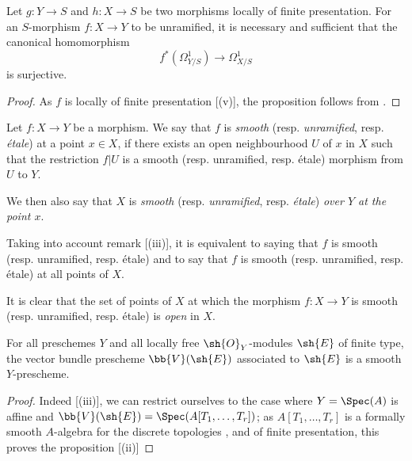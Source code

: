 \begin{proposition}[17.3.6]
\label{IV.17.3.6}
Let $g:Y\to S$ and $h:X\to S$ be two morphisms locally of finite presentation.
For an $S$-morphism $f:X\to Y$ to be unramified, it is necessary and sufficient that the canonical homomorphism 
\[
  f^*(\Omega_{Y/S}^1)\to\Omega_{X/S}^1
\]
is surjective.
\end{proposition}

\begin{proof}
As $f$ is locally of finite presentation [(v)], the proposition follows from .
\end{proof}

\begin{definition}[17.3.7]
\label{IV.17.3.7}
Let $f:X\to Y$ be a morphism.
We say that $f$ is \emph{smooth} (resp. \emph{unramified}, resp. \emph{\'etale}) at a point $x\in X$, if there exists an open neighbourhood $U$ of $x$ in $X$ such that the restriction $f|U$ is a smooth (resp. unramified, resp. \'etale) morphism from $U$ to $Y$.
\end{definition}

We then also say that $X$ is \emph{smooth} (resp. \emph{unramified}, resp. \emph{\'etale}) \emph{over $Y$ at the point $x$}.

Taking into account remark [(iii)], it is equivalent to saying that $f$ is smooth (resp. unramified, resp. \'etale) and to say that $f$ is smooth (resp. unramified, resp. \'etale) at all points of $X$.

It is clear that the set of points of $X$ at which the morphism $f:X\to Y$ is smooth (resp. unramified, resp. \'etale) is \emph{open} in $X$.

\begin{proposition}[17.3.8]
\label{IV.17.3.8}
For all preschemes $Y$ and all locally free $\sh{O}_Y$-modules $\sh{E}$ of finite type, the vector bundle prescheme $\bb{V}(\sh{E})$  associated to $\sh{E}$ is a smooth $Y$-prescheme.
\end{proposition}

\begin{proof}
Indeed [(iii)], we can restrict ourselves to the case where $Y=\Spec(A)$ is affine and $\bb{V}(\sh{E})=\Spec(A[T_1,\dots,T_r])$;
as $A[T_1,\dots,T_r]$ is a formally smooth $A$-algebra for the discrete topologies , and of finite presentation, this proves the proposition [(ii)] 
\end{proof}

